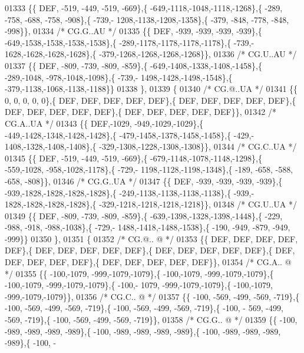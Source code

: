 \begin{DoxyCode}
01333 \{\{  DEF, -519, -449, -519, -669\},\{ -649,-1118,-1048,-1118,-1268\},\{ -289, -758, -688, -758, -908\},\{ -739,-
      1208,-1138,-1208,-1358\},\{ -379, -848, -778, -848, -998\}\},
01334 \textcolor{comment}{/* CG.G..AU */}
01335 \{\{  DEF, -939, -939, -939, -939\},\{ -649,-1538,-1538,-1538,-1538\},\{ -289,-1178,-1178,-1178,-1178\},\{ -739,-
      1628,-1628,-1628,-1628\},\{ -379,-1268,-1268,-1268,-1268\}\},
01336 \textcolor{comment}{/* CG.U..AU */}
01337 \{\{  DEF, -809, -739, -809, -859\},\{ -649,-1408,-1338,-1408,-1458\},\{ -289,-1048, -978,-1048,-1098\},\{ -739,-
      1498,-1428,-1498,-1548\},\{ -379,-1138,-1068,-1138,-1188\}\}
01338 \},
01339 \{
01340 \textcolor{comment}{/* CG.@..UA */}
01341 \{\{    0,    0,    0,    0,    0\},\{  DEF,  DEF,  DEF,  DEF,  DEF\},\{  DEF,  DEF,  DEF,  DEF,  DEF\},\{  DEF,  
      DEF,  DEF,  DEF,  DEF\},\{  DEF,  DEF,  DEF,  DEF,  DEF\}\},
01342 \textcolor{comment}{/* CG.A..UA */}
01343 \{\{  DEF,-1029, -949,-1029,-1029\},\{ -449,-1428,-1348,-1428,-1428\},\{ -479,-1458,-1378,-1458,-1458\},\{ -429,-
      1408,-1328,-1408,-1408\},\{ -329,-1308,-1228,-1308,-1308\}\},
01344 \textcolor{comment}{/* CG.C..UA */}
01345 \{\{  DEF, -519, -449, -519, -669\},\{ -679,-1148,-1078,-1148,-1298\},\{ -559,-1028, -958,-1028,-1178\},\{ -729,-
      1198,-1128,-1198,-1348\},\{ -189, -658, -588, -658, -808\}\},
01346 \textcolor{comment}{/* CG.G..UA */}
01347 \{\{  DEF, -939, -939, -939, -939\},\{ -939,-1828,-1828,-1828,-1828\},\{ -249,-1138,-1138,-1138,-1138\},\{ -939,-
      1828,-1828,-1828,-1828\},\{ -329,-1218,-1218,-1218,-1218\}\},
01348 \textcolor{comment}{/* CG.U..UA */}
01349 \{\{  DEF, -809, -739, -809, -859\},\{ -639,-1398,-1328,-1398,-1448\},\{ -229, -988, -918, -988,-1038\},\{ -729,-
      1488,-1418,-1488,-1538\},\{ -190, -949, -879, -949, -999\}\}
01350 \},
01351 \{
01352 \textcolor{comment}{/* CG.@.. @ */}
01353 \{\{  DEF,  DEF,  DEF,  DEF,  DEF\},\{  DEF,  DEF,  DEF,  DEF,  DEF\},\{  DEF,  DEF,  DEF,  DEF,  DEF\},\{  DEF,  
      DEF,  DEF,  DEF,  DEF\},\{  DEF,  DEF,  DEF,  DEF,  DEF\}\},
01354 \textcolor{comment}{/* CG.A.. @ */}
01355 \{\{ -100,-1079, -999,-1079,-1079\},\{ -100,-1079, -999,-1079,-1079\},\{ -100,-1079, -999,-1079,-1079\},\{ -100,-
      1079, -999,-1079,-1079\},\{ -100,-1079, -999,-1079,-1079\}\},
01356 \textcolor{comment}{/* CG.C.. @ */}
01357 \{\{ -100, -569, -499, -569, -719\},\{ -100, -569, -499, -569, -719\},\{ -100, -569, -499, -569, -719\},\{ -100, -
      569, -499, -569, -719\},\{ -100, -569, -499, -569, -719\}\},
01358 \textcolor{comment}{/* CG.G.. @ */}
01359 \{\{ -100, -989, -989, -989, -989\},\{ -100, -989, -989, -989, -989\},\{ -100, -989, -989, -989, -989\},\{ -100, -

\end{DoxyCode}
